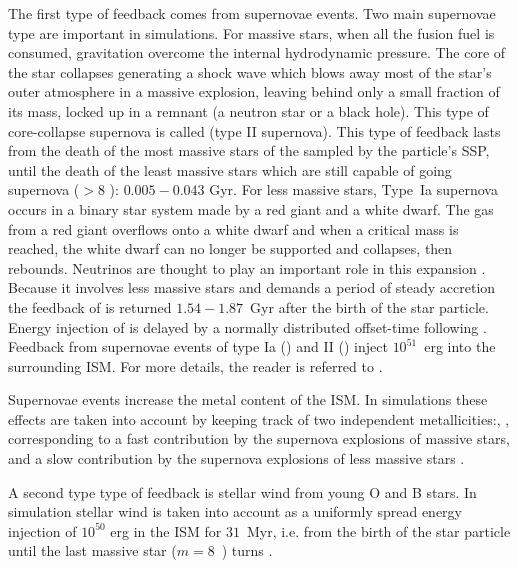 The first type of feedback comes from supernovae events. Two main supernovae type are important in simulations. For massive stars, when all the fusion fuel is consumed, gravitation overcome the internal hydrodynamic pressure. The core of the star collapses generating a shock wave which blows away most of the star's outer atmosphere in a massive explosion, leaving behind only a small fraction of its mass, locked up in a remnant (a neutron star or a black hole). This type of core-collapse supernova is called \snii{} (type II supernova).
This type of feedback lasts from the death of the most massive stars of the sampled by the particle's SSP, until the death of the least massive stars which are still capable of going supernova ($>8$ \Msun ): $0.005 - 0.043$ Gyr.
For less massive stars, Type~Ia supernova occurs in a binary star system made by a red giant and a white dwarf.
The gas from a red giant overflows onto a white dwarf and when a critical mass is reached, the white dwarf can no longer be supported and collapses, then rebounds. Neutrinos are thought to play an important role in this expansion \citep{Wongwathanarat2017}.
Because it involves less massive stars and demands a period of steady accretion the feedback of \snia{} is returned $1.54 − 1.87$~Gyr after the birth of the star particle. Energy injection of \snia{} is delayed by a normally distributed offset-time following \citet{Strolger2004}.
Feedback from supernovae events of type Ia (\snia) and II (\snii) inject $10^{51}$~erg into the surrounding ISM. For more details, the reader is referred to \cite{Valcke2008}.


Supernovae events increase the metal content of the ISM. %
In simulations these effects are taken into account by keeping track of two independent metallicities:\feh, \mgfe, corresponding to a fast contribution by the supernova explosions of massive stars, and a slow contribution by the supernova explosions of less massive stars \citep{DeRijcke2013, Vandenbroucke2016}.

A second type type of feedback is stellar wind from young O and B stars.
In simulation stellar wind is taken into account as a uniformly spread energy injection of $10^{50}$ erg in the ISM for $31$~Myr, i.e. from the birth of the star particle until the last massive star ($m = 8$~\Msun) turns \snii{}.



